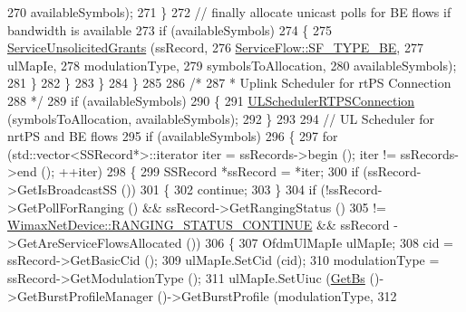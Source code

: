 \begin{DoxyCode}
270                                             availableSymbols);
271                 \}
272               \textcolor{comment}{// finally allocate unicast polls for BE flows if bandwidth is available}
273               \textcolor{keywordflow}{if} (availableSymbols)
274                 \{
275                   \hyperlink{classns3_1_1UplinkSchedulerRtps_ab101ce69266831aad941b4c553d82026}{ServiceUnsolicitedGrants} (ssRecord,
276                                             \hyperlink{classns3_1_1ServiceFlow_a7990ba10be1e098328fd1e6382a26235af93a8bd8fce654e688f957f6f362e5c7}{ServiceFlow::SF\_TYPE\_BE},
277                                             ulMapIe,
278                                             modulationType,
279                                             symbolsToAllocation,
280                                             availableSymbols);
281                 \}
282             \}
283         \}
284     \}
285 
286   \textcolor{comment}{/*}
287 \textcolor{comment}{   * Uplink Scheduler for rtPS Connection}
288 \textcolor{comment}{   */}
289   \textcolor{keywordflow}{if} (availableSymbols)
290     \{
291       \hyperlink{classns3_1_1UplinkSchedulerRtps_aee60dd2773cd1404f6efe04373b567ea}{ULSchedulerRTPSConnection} (symbolsToAllocation, availableSymbols);
292     \}
293 
294   \textcolor{comment}{// UL Scheduler for nrtPS and BE flows}
295   \textcolor{keywordflow}{if} (availableSymbols)
296     \{
297       \textcolor{keywordflow}{for} (std::vector<SSRecord*>::iterator iter = ssRecords->begin (); iter != ssRecords->end (); ++iter)
298         \{
299           SSRecord *ssRecord = *iter;
300           \textcolor{keywordflow}{if} (ssRecord->GetIsBroadcastSS ())
301             \{
302               \textcolor{keywordflow}{continue};
303             \}
304           \textcolor{keywordflow}{if} (!ssRecord->GetPollForRanging () && ssRecord->GetRangingStatus ()
305               != \hyperlink{classns3_1_1WimaxNetDevice_a2a74c0f01e51abc1851a630242e7b591ace0a03105b6d7cf2c6ec79e9789dc3a6}{WimaxNetDevice::RANGING\_STATUS\_CONTINUE} && ssRecord
      ->GetAreServiceFlowsAllocated ())
306             \{
307               OfdmUlMapIe ulMapIe;
308               cid = ssRecord->GetBasicCid ();
309               ulMapIe.SetCid (cid);
310               modulationType = ssRecord->GetModulationType ();
311               ulMapIe.SetUiuc (\hyperlink{classns3_1_1UplinkScheduler_afe61b7de71d92d2dff1b135744a6ff7e}{GetBs} ()->GetBurstProfileManager ()->GetBurstProfile (modulationType,
312                                                                                      

\end{DoxyCode}
